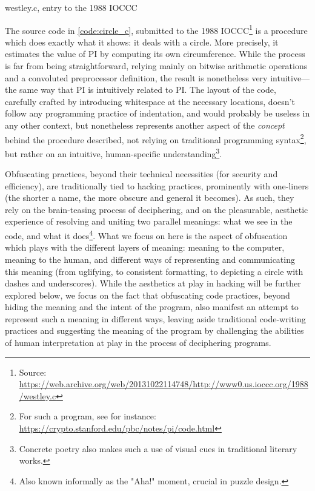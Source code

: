 \begin{listing}
  \inputminted{c}{./corpus/circle.c}
  \caption{westley.c, entry to the 1988 IOCCC}
  \label{code:circle_c}
\end{listing}

The source code in \ref{code:circle_c}, submitted to the 1988 IOCCC\footnote{Source: \url{https://web.archive.org/web/20131022114748/http://www0.us.ioccc.org/1988/westley.c}} is a procedure which does exactly what it shows: it deals with a circle. More precisely, it estimates the value of PI by computing its own circumference. While the process is far from being straightforward, relying mainly on bitwise arithmetic operations and a convoluted preprocessor definition, the result is nonetheless very intuitive—the same way that PI is intuitively related to PI. The layout of the code, carefully crafted by introducing whitespace at the necessary locations, doesn't follow any programming practice of indentation, and would probably be useless in any other context, but nonetheless represents another aspect of the \emph{concept} behind the procedure described, not relying on traditional programming syntax\footnote{For such a program, see for instance: \url{https://crypto.stanford.edu/pbc/notes/pi/code.html}}, but rather on an intuitive, human-specific understanding\footnote{Concrete poetry also makes such a use of visual cues in traditional literary works.}.

Obfuscating practices, beyond their technical necessities (for security and efficiency), are traditionally tied to hacking practices, prominently with one-liners (the shorter a name, the more obscure and general it becomes). As such, they rely on the brain-teasing process of deciphering, and on the pleasurable, aesthetic experience of resolving and uniting two parallel meanings: what we see in the code, and what it does\footnote{Also known informally as the "Aha!" moment, crucial in puzzle design.}. What we focus on here is the aspect of obfuscation which plays with the different layers of meaning: meaning to the computer, meaning to the human, and different ways of representing and communicating this meaning (from uglifying, to consistent formatting, to depicting a circle with dashes and underscores). While the aesthetics at play in hacking will be further explored below, we focus on the fact that obfuscating code practices, beyond hiding the meaning and the intent of the program, also manifest an attempt to represent such a meaning in different ways, leaving aside traditional code-writing practices and suggesting the meaning of the program by challenging the abilities of human interpretation at play in the process of deciphering programs.

